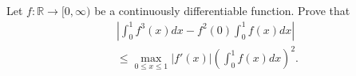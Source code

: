 \documentclass{article}
\begin{document}
\setlength{\parindent}{0pt}
Let $f:\mathbb{R}\to[0,\infty)$ be a continuously differentiable function. Prove that
\begin{multline*}
\left|\int_{0}^{1}f^{3}(x)dx-f^{2}(0)\int_{0}^{1}f(x)dx\right|\\\le\max_{0\le x\le1}|f'(x)|\left(\int_{0}^{1}f(x)dx\right)^{2}.
\end{multline*}
\end{document}
